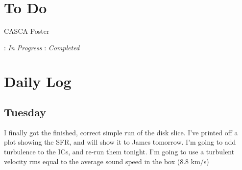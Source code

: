 \documentclass[11pt,letterpaper]{article}
\begin{document}
\section{To Do}
\begin{bullets}
\item[\checkmark] CASCA Poster
\end{bullets}

\textleaf : \textit{In Progress} \qquad \checkmark : \textit{Completed}
\section{Daily Log}

\subsection{Tuesday}

I finally got the finished, correct simple run of the disk slice. I've
printed off a plot showing the SFR, and will show it to James tomorrow.
I'm going to add turbulence to the ICs, and re-run them tonight. I'm
going to use a turbulent velocity rms equal to the average sound speed
in the box (8.8 km/s)
\end{document}
